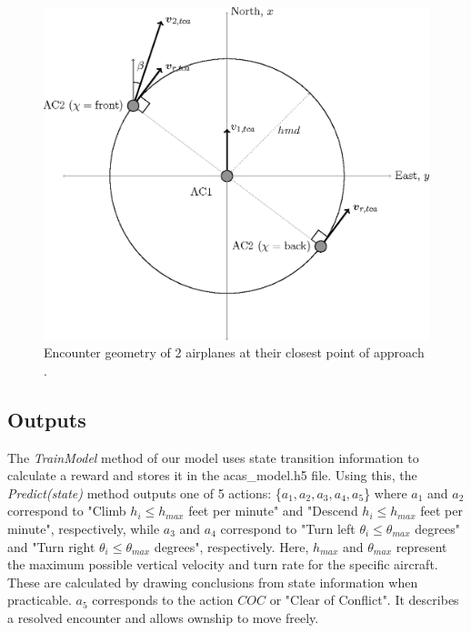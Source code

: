 \documentclass[journal, a4paper]{IEEEtran}
\begin{document}
    \begin{figure}[!hbt]
        \begin{center}
        \includegraphics[width=\columnwidth]{encounter_geometry.png}
        \caption{Encounter geometry of 2 airplanes at their closest point of approach \cite{correnc}.}
        \label{fig:enc_geomt}
        \end{center}
    \end{figure}
    
\subsection{Outputs}
The \textit{TrainModel} method of our model uses state transition information to calculate a reward and stores it in the acas\_model.h5 file. Using this, the \textit{Predict(state)} method outputs one of 5 actions: \{$a_1, a_2, a_3, a_4, a_5$\} where $a_1$ and $a_2$ correspond to "Climb $h_{i} \leq h_{max}$ feet per minute" and "Descend $h_{i}\leq h_{max}$ feet per minute", respectively, while $a_3$ and $a_4$ correspond to "Turn left $\theta_{i}\leq\theta_{max}$ degrees" and "Turn right $\theta_{i} \leq \theta_{max}$ degrees", respectively. Here, $h_{max}$ and $\theta_{max}$ represent the maximum possible vertical velocity and turn rate for the specific aircraft. These are calculated by drawing conclusions from state information when practicable. $a_5$ corresponds to the action $COC$ or "Clear of Conflict". It describes a resolved encounter and allows ownship to move freely.  
\end{document}
